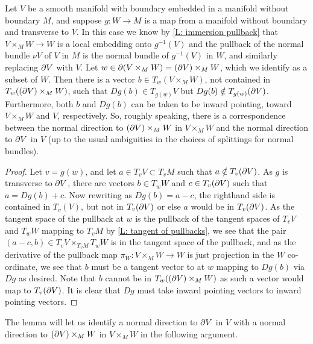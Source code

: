 \begin{lemma}\label{L: pullback boundary normal}
	Let $V$ be a smooth manifold with boundary embedded in a manifold without boundary $M$, and suppose $g \colon W \to M$ is a map from a manifold without boundary and transverse to $V$.
	In this case we know by \cref{L: immersion pullback} that $V \times_M W \to W$ is a local embedding onto $g^{-1}(V)$ and the pullback of the normal bundle $\nu V$ of $V$ in $M$ is the normal bundle of $g^{-1}(V)$ in $W$, and similarly replacing $\partial V$ with $V$.
	Let $w\in \partial (V \times_M W) = (\partial V) \times_M W$, which we identify as a subset of $W$.
	Then there is a vector $b \in T_w(V \times_M W)$, not contained in $T_w((\partial V) \times_M W)$, such that $Dg(b) \in T_{g(w)}V$ but $Dg(b) \notin T_{g(w)}(\partial V)$. Furthermore, both $b$ and $Dg(b)$ can be taken to be inward pointing, toward $V \times_M W$ and $V$, respectively.
	So, roughly speaking, there is a correspondence between the normal direction to $(\partial V) \times_M W$ in $V \times_M W$ and the normal direction to $\partial V$ in $V$ (up to the usual ambiguities in the choices of splittings for normal bundles).
\end{lemma}
\begin{proof}
	Let $v = g(w)$, and let $a \in T_v V \subset T_v M$ such that $a \notin T_v (\partial V)$.
	As $g$ is transverse to $\partial V$, there are vectors $b \in T_w W$ and $c \in T_v(\partial V)$ such that $a= Dg(b) + c$.
	Now rewriting as $Dg(b) = a - c$, the righthand side is contained in $T_v(V)$, but not in $T_v(\partial V)$ or else $a$ would be in $T_v(\partial V)$.
	As the tangent space of the pullback at $w$ is the pullback of the tangent spaces of $T_v V$ and $T_w W$ mapping to $T_v M$ by \cref{L: tangent of pullbacks}, we see that the pair $(a-c, b) \in T_v V \times_{T_v M} T_w W$ is in the tangent space of the pullback, and as the derivative of the pullback map $\pi_W \colon V \times_M W \to W$ is just projection in the $W$ co-ordinate, we see that $b$ must be a tangent vector to at $w$ mapping to $Dg(b)$ via $Dg$ as desired.
	Note that $b$ cannot be in $T_w((\partial V) \times_M W)$ as such a vector would map to $T_v (\partial V)$.
	It is clear that $Dg$ must take inward pointing vectors to inward pointing vectors.
\end{proof}

The lemma will let us identify a normal direction to $\partial V$ in $V$ with a normal direction to $(\partial V) \times_M W$ in $V \times_M W$ in the following argument.

